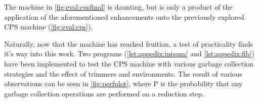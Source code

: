 The machine in \autoref{fig:eval:cpsfinal} is daunting, but is only a product of the application of the aforementioned enhancements onto the previously explored CPS machine (\autoref{fig:eval:cps}).

Naturally, now that the machine has reached fruition, a test of practicality finds it's way into this work.
Two programs (\autoref{lst:appedix:intsum} and \autoref{lst:appedix:fib}) have been implemented to test the CPS machine with various garbage collection strategies and the effect of trimmers and environments.
The result of various observations can be seen in \autoref{fig:perfplot}, where P is the probability that any garbage collection operations are performed on a reduction step.
\begin{figure}[htp]
	\vspace*{-4cm}
	\hspace*{-1cm}
	\begin{subfigure}{0.49\textwidth}
		\centering
	\end{subfigure}
	\hfil
	\begin{subfigure}{0.49\textwidth}
		\centering
\end{subfigure}
\end{figure}
